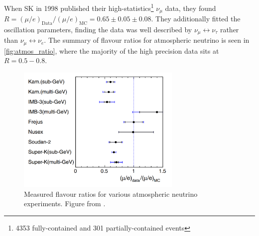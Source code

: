When SK in 1998 published\cite{sk_disc} their high-statistics\footnote{4353 fully-contained and 301 partially-contained events} $\nu_\mu$ data, they found $R=\left( \mu/e \right)_\text{Data}/\left( \mu/e \right)_\text{MC} =0.65\pm0.05\pm0.08$. They additionally fitted the oscillation parameters, finding the data was well described by $\nu_\mu \leftrightarrow \nu_\tau$ rather than $\nu_\mu \leftrightarrow \nu_e$. The summary of flavour ratios for atmospheric neutrino is seen in \autoref{fig:atmos_ratio}, where the majority of the high precision data sits at $R=0.5-0.8$.
\begin{figure}[h]
	\includegraphics[width=0.7\textwidth, trim={0mm 0mm 0mm 0mm}, clip,page=1]{figures/theory/flavour_ratio}
	\caption{Measured flavour ratios for various atmospheric neutrino experiments. Figure from \cite{kajita_summary}.}
	\label{fig:atmos_ratio}
\end{figure}

